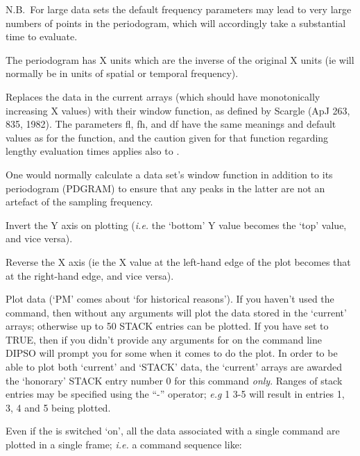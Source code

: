 \begin {description}
N.B.\ For large data sets the default frequency parameters may lead to
very large numbers of points in the periodogram, which will
accordingly take a substantial time to evaluate.

The periodogram has X units which are the inverse of the original X
units (ie will normally be in units of spatial or temporal frequency).

Replaces the data in the current arrays (which should have
monotonically increasing X values) with their window function, as
defined by Scargle (ApJ 263, 835, 1982). The parameters fl, fh, and df
have the same meanings and default values as for the   function,
and the caution given for that function regarding lengthy evaluation
times applies also to . 

One would normally calculate a data set's window function in addition
to its periodogram (PDGRAM) to ensure that any peaks in the latter are
not an artefact of the sampling frequency.

Invert the Y axis on plotting ({\em i.e.} the `bottom' Y value becomes
the `top' value, and vice versa).

Reverse the X axis (ie the X value at the left-hand edge of the plot
becomes that at the right-hand edge, and vice versa).

Plot data (`PM' comes about `for historical reasons'). If you haven't
used the   command, then   without any arguments will plot the
data stored in the `current' arrays; otherwise up to 50 STACK entries
can be plotted. If you have set   to TRUE, then if you didn't
provide any arguments for   on the command line DIPSO will prompt you
for some when it comes to do the plot. In order to be able to plot
both `current' and `STACK' data, the `current' arrays are awarded the
`honorary' STACK entry number 0 for this command {\em only}. Ranges of
stack entries may be specified using the ``-'' operator; {\em e.g}   1 3-5
will result in entries 1, 3, 4 and 5 being plotted.

Even if the   is switched `on', all the data associated with a single  
command are plotted in a single frame; {\em i.e.} a command sequence like:


\end{description}
